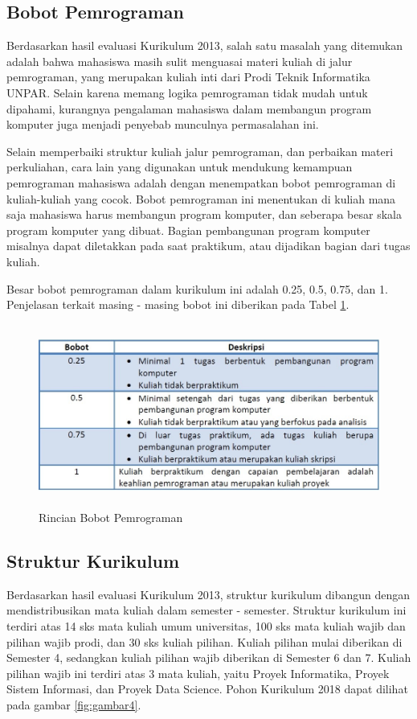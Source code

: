 \subsection{Bobot Pemrograman}
Berdasarkan hasil evaluasi Kurikulum 2013, salah satu masalah yang ditemukan adalah bahwa mahasiswa masih sulit menguasai materi kuliah di jalur pemrograman, yang merupakan kuliah inti dari Prodi Teknik Informatika UNPAR. Selain karena memang logika pemrograman tidak mudah untuk dipahami, kurangnya pengalaman mahasiswa dalam membangun program komputer juga menjadi penyebab munculnya permasalahan ini.

Selain memperbaiki struktur kuliah jalur pemrograman, dan perbaikan materi perkuliahan, cara lain yang digunakan untuk mendukung kemampuan pemrograman mahasiswa adalah dengan menempatkan bobot pemrograman di kuliah-kuliah yang cocok. Bobot pemrograman ini menentukan di kuliah mana saja mahasiswa harus membangun program komputer, dan seberapa besar skala program komputer yang
dibuat. Bagian pembangunan program komputer misalnya dapat diletakkan pada saat praktikum, atau dijadikan bagian dari tugas kuliah.

Besar bobot pemrograman dalam kurikulum ini adalah 0.25, 0.5, 0.75, dan 1. Penjelasan terkait masing - masing
bobot ini diberikan pada Tabel \ref{fig:gambar3}.

\begin{figure}[H]
    \centering
    \includegraphics[width=12cm, height=6cm]{Gambar/Bobot Pemorgraman .jpg}
    \caption{Rincian Bobot Pemrograman}
    \label{fig:gambar3}
\end{figure}

\subsection{Struktur Kurikulum}
Berdasarkan hasil evaluasi Kurikulum 2013, struktur kurikulum dibangun dengan mendistribusikan mata kuliah dalam semester - semester. Struktur kurikulum ini terdiri atas 14 sks mata kuliah umum universitas, 100 sks mata kuliah wajib dan pilihan wajib prodi, dan 30 sks kuliah pilihan. Kuliah pilihan mulai diberikan di Semester 4, sedangkan kuliah pilihan wajib diberikan di Semester 6 dan 7. Kuliah pilihan wajib ini terdiri atas 3 mata kuliah, yaitu Proyek Informatika, Proyek Sistem Informasi, dan Proyek Data Science. Pohon Kurikulum 2018 dapat dilihat pada gambar \ref{fig:gambar4}.

